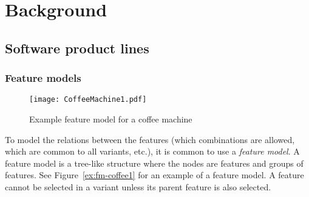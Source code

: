 \chapter{Background} 

\section{Software product lines}
\label{sec:software-product-lines}


\subsection{Feature models}
\label{sub:feature-models}
\begin{figure}
   \begin{center}
      \texttt{[image: CoffeeMachine1.pdf]}
   \end{center}
   \caption[Example feature model for a coffee machine]{Example feature model for a coffee machine \protect\footnotemark}
   \label{ex:fm-coffee1}
\end{figure}

To model the relations between the features (which combinations are allowed, which are common to all variants, etc.), it is common to use a \emph{feature model}. A feature model is a tree-like structure where the nodes are features and groups of features. See Figure~\vref{ex:fm-coffee1} for an example of a feature model. A feature cannot be selected in a variant unless its parent feature is also selected. \cite{art:feature-models-grammars-and-propositional-formulas}

